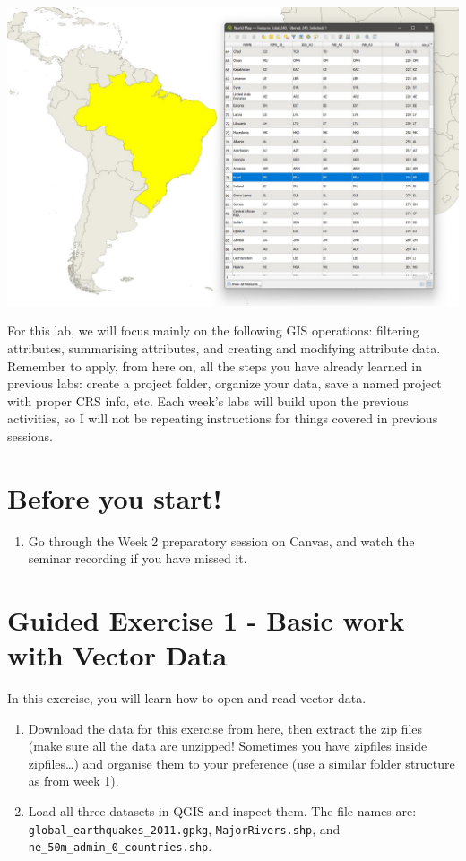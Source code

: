 \documentclass[
  letterpaper,
  DIV=11,
  numbers=noendperiod]{scrreprt}
\providecommand{\tightlist}{%
  \setlength{\itemsep}{0pt}\setlength{\parskip}{0pt}}\usepackage{longtable,booktabs,array}
\begin{document}
\includegraphics{images/lab_3/lab3_fig1_geometries+attributes.jpg}

For this lab, we will focus mainly on the following GIS operations:
filtering attributes, summarising attributes, and creating and modifying
attribute data. Remember to apply, from here on, all the steps you have
already learned in previous labs: create a project folder, organize your
data, save a named project with proper CRS info, etc. Each week's labs
will build upon the previous activities, so I will not be repeating
instructions for things covered in previous sessions.

\section{Before you start!}\label{before-you-start-1}

\begin{enumerate}
\def\labelenumi{\arabic{enumi}.}
\tightlist
\item
  Go through the Week 2 preparatory session on Canvas, and watch the
  seminar recording if you have missed it.
\end{enumerate}

\section{Guided Exercise 1 - Basic work with Vector
Data}\label{guided-exercise-1---basic-work-with-vector-data}

In this exercise, you will learn how to open and read vector data.

\begin{enumerate}
\def\labelenumi{(\arabic{enumi})}
\setcounter{enumi}{64}
\item
  \href{https://stir-my.sharepoint.com/:f:/g/personal/ala2_stir_ac_uk/EkD-gndA8ihElmcQFirYbPEBN6qvH2tzyLgJ8UujpCXi2Q?e=tsvmoG}{Download
  the data for this exercise from here}, then extract the zip files
  (make sure all the data are unzipped! Sometimes you have zipfiles
  inside zipfiles\ldots) and organise them to your preference (use a
  similar folder structure as from week 1).
\item
  Load all three datasets in QGIS and inspect them. The file names are:
  \texttt{global\_earthquakes\_2011.gpkg}, \texttt{MajorRivers.shp}, and
  \texttt{ne\_50m\_admin\_0\_countries.shp}.
\end{enumerate}
\end{document}
